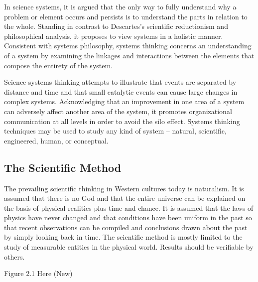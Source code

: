 In science systems, it is argued that the only way to fully understand why a problem or element occurs and persists is to understand the parts in relation to the whole. Standing in contrast to Descartes’s scientific reductionism and philosophical analysis, it proposes to view systems in a holistic manner. Consistent with systems philosophy, systems thinking concerns an understanding of a system by examining the linkages and interactions between the elements that compose the entirety of the system.

Science systems thinking attempts to illustrate that events are separated by distance and time and that small catalytic events can cause large changes in complex systems. Acknowledging that an improvement in one area of a system can adversely affect another area of the system, it promotes organizational communication at all levels in order to avoid the silo effect. Systems thinking techniques may be used to study any kind of system – natural, scientific, engineered, human, or conceptual.

\subsection{The Scientific Method}

The prevailing scientific thinking in Western cultures today is naturalism. It is assumed that there is no God and that the entire universe can be explained on the basis of physical realities plus time and chance. It is assumed that the laws of physics have never changed and that conditions have been uniform in the past so that recent observations can be compiled and conclusions drawn about the past by simply looking back in time. The scientific method is mostly limited to the study of measurable entities in the physical world. Results should be verifiable by others.

Figure 2.1 Here (New)

